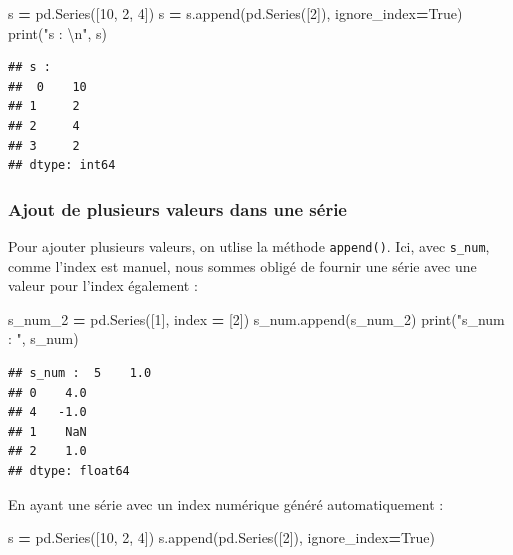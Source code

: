 \documentclass[12pt,]{book}
\newenvironment{Shaded}{\begin{snugshade}}{\end{snugshade}}
\newcommand{\DecValTok}[1]{\textcolor[rgb]{0.00,0.00,0.81}{#1}}
\newcommand{\CharTok}[1]{\textcolor[rgb]{0.31,0.60,0.02}{#1}}
\newcommand{\StringTok}[1]{\textcolor[rgb]{0.31,0.60,0.02}{#1}}
\newcommand{\VariableTok}[1]{\textcolor[rgb]{0.00,0.00,0.00}{#1}}
\newcommand{\OperatorTok}[1]{\textcolor[rgb]{0.81,0.36,0.00}{\textbf{#1}}}
\newcommand{\BuiltInTok}[1]{#1}
\newcommand{\NormalTok}[1]{#1}
\numberwithin{equation}{section}
\numberwithin{countremarque}{section}
\begin{document}
\begin{Shaded}
\begin{Highlighting}[]
\NormalTok{s }\OperatorTok{=}\NormalTok{ pd.Series([}\DecValTok{10}\NormalTok{, }\DecValTok{2}\NormalTok{, }\DecValTok{4}\NormalTok{])}
\NormalTok{s }\OperatorTok{=}\NormalTok{ s.append(pd.Series([}\DecValTok{2}\NormalTok{]), ignore_index}\OperatorTok{=}\VariableTok{True}\NormalTok{)}
\BuiltInTok{print}\NormalTok{(}\StringTok{"s : }\CharTok{\textbackslash{}n}\StringTok{"}\NormalTok{, s)}
\end{Highlighting}
\end{Shaded}

\begin{lstlisting}
## s : 
##  0    10
## 1     2
## 2     4
## 3     2
## dtype: int64
\end{lstlisting}

\subsubsection{Ajout de plusieurs valeurs dans une
série}\label{ajout-de-plusieurs-valeurs-dans-une-serie}

Pour ajouter plusieurs valeurs, on utlise la méthode \texttt{append()}.
Ici, avec \texttt{s\_num}, comme l'index est manuel, nous sommes obligé
de fournir une série avec une valeur pour l'index également :

\begin{Shaded}
\begin{Highlighting}[]
\NormalTok{s_num_2 }\OperatorTok{=}\NormalTok{ pd.Series([}\DecValTok{1}\NormalTok{], index }\OperatorTok{=}\NormalTok{ [}\DecValTok{2}\NormalTok{])}
\NormalTok{s_num.append(s_num_2)}
\BuiltInTok{print}\NormalTok{(}\StringTok{"s_num : "}\NormalTok{, s_num)}
\end{Highlighting}
\end{Shaded}

\begin{lstlisting}
## s_num :  5    1.0
## 0    4.0
## 4   -1.0
## 1    NaN
## 2    1.0
## dtype: float64
\end{lstlisting}

En ayant une série avec un index numérique généré automatiquement :

\begin{Shaded}
\begin{Highlighting}[]
\NormalTok{s }\OperatorTok{=}\NormalTok{ pd.Series([}\DecValTok{10}\NormalTok{, }\DecValTok{2}\NormalTok{, }\DecValTok{4}\NormalTok{])}
\NormalTok{s.append(pd.Series([}\DecValTok{2}\NormalTok{]), ignore_index}\OperatorTok{=}\VariableTok{True}\NormalTok{)}
\end{Highlighting}
\end{Shaded}
\end{document}
